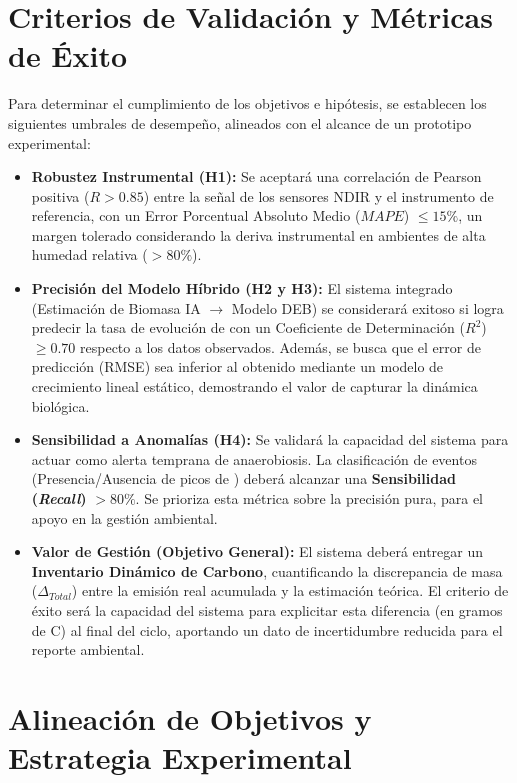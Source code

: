 \section{Criterios de Validación y Métricas de Éxito}Para determinar el cumplimiento de los objetivos e hipótesis, se establecen los siguientes umbrales de desempeño, alineados con el alcance de un prototipo experimental:\begin{itemize}\item \textbf{Robustez Instrumental (H1):} Se aceptará una correlación de Pearson positiva ($R > 0.85$) entre la señal de los sensores NDIR y el instrumento de referencia, con un Error Porcentual Absoluto Medio ($MAPE$) $\leq 15\%$, un margen tolerado considerando la deriva instrumental en ambientes de alta humedad relativa ($>80\%$).\item \textbf{Precisión del Modelo Híbrido (H2 y H3):} El sistema integrado (Estimación de Biomasa IA $\to$ Modelo DEB) se considerará exitoso si logra predecir la tasa de evolución de  con un Coeficiente de Determinación ($R^2$) $\geq 0.70$ respecto a los datos observados. Además, se busca que el error de predicción (RMSE) sea inferior al obtenido mediante un modelo de crecimiento lineal estático, demostrando el valor de capturar la dinámica biológica.

\item \textbf{Sensibilidad a Anomalías (H4):} Se validará la capacidad del sistema para actuar como alerta temprana de anaerobiosis. La clasificación de eventos (Presencia/Ausencia de picos de ) deberá alcanzar una \textbf{Sensibilidad (\textit{Recall})} $> 80\%$. Se prioriza esta métrica sobre la precisión pura, para el apoyo en la gestión ambiental.

\item \textbf{Valor de Gestión (Objetivo General):} El sistema deberá entregar un \textbf{Inventario Dinámico de Carbono}, cuantificando la discrepancia de masa ($\Delta_{Total}$) entre la emisión real acumulada y la estimación teórica. El criterio de éxito será la capacidad del sistema para explicitar esta diferencia (en gramos de C) al final del ciclo, aportando un dato de incertidumbre reducida para el reporte ambiental.
\end{itemize}
\section{Alineación de Objetivos y Estrategia Experimental}

